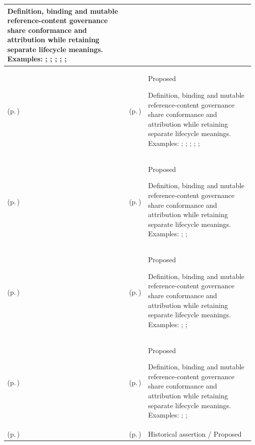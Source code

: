 \begin{longtable}{|>{\raggedright\arraybackslash}p{0.27\TableWidth}|>{\raggedright\arraybackslash}p{0.27\TableWidth}|>{\raggedright\arraybackslash}p{0.46\TableWidth}|}
Definition, binding and mutable reference-content governance share conformance and attribution while retaining separate lifecycle meanings. Examples: \nameref{feature:feat-ise-14}; \nameref{feature:feat-ise-15}; \nameref{function:resolve-clinical-concept}; \nameref{service:terminology-concept-resolution-service}; \nameref{function:map-clinical-concept}; \nameref{service:terminology-mapping-service}\\\hline
\nameref{cap:bec-clinical-knowledge-services} (p.\,\pageref{cap:bec-clinical-knowledge-services}) & \nameref{cap:ec-07} (p.\,\pageref{cap:ec-07}) & Proposed

Definition, binding and mutable reference-content governance share conformance and attribution while retaining separate lifecycle meanings. Examples: \nameref{feature:feat-ise-14}; \nameref{feature:feat-ise-15}; \nameref{function:resolve-clinical-concept}; \nameref{service:terminology-concept-resolution-service}; \nameref{function:map-clinical-concept}; \nameref{service:terminology-mapping-service}\\\hline
\nameref{cap:bec-governed-reference-dataset-administration} (p.\,\pageref{cap:bec-governed-reference-dataset-administration}) & \nameref{cap:ec-13} (p.\,\pageref{cap:ec-13}) & Proposed

Definition, binding and mutable reference-content governance share conformance and attribution while retaining separate lifecycle meanings. Examples: \nameref{feature:governed-dataset-content-revision}; \nameref{function:accept-governed-dataset-revision}; \nameref{service:governed-reference-dataset-content-query}\\\hline
\nameref{cap:bec-governed-reference-dataset-administration} (p.\,\pageref{cap:bec-governed-reference-dataset-administration}) & \nameref{cap:ec-03} (p.\,\pageref{cap:ec-03}) & Proposed

Definition, binding and mutable reference-content governance share conformance and attribution while retaining separate lifecycle meanings. Examples: \nameref{feature:governed-dataset-content-revision}; \nameref{function:accept-governed-dataset-revision}; \nameref{service:governed-reference-dataset-content-query}\\\hline
\nameref{cap:bec-governed-reference-dataset-administration} (p.\,\pageref{cap:bec-governed-reference-dataset-administration}) & \nameref{cap:ec-07} (p.\,\pageref{cap:ec-07}) & Proposed

Definition, binding and mutable reference-content governance share conformance and attribution while retaining separate lifecycle meanings. Examples: \nameref{feature:governed-dataset-content-revision}; \nameref{function:accept-governed-dataset-revision}; \nameref{service:governed-reference-dataset-content-query}\\\hline
\nameref{cap:bec-information-authority-representation} (p.\,\pageref{cap:bec-information-authority-representation}) & \nameref{cap:ec-information-authority-qualification} (p.\,\pageref{cap:ec-information-authority-qualification}) & Historical assertion / Proposed


\end{longtable}

